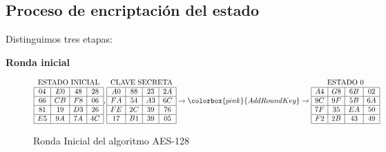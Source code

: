 \subsection{Proceso de encriptación del estado}
Distinguimos tres etapas:
\begin{center}{\bf Ronda inicial}\end{center}
\begin{figure}[!ht]
\begin{figurebox}
\begin{center}
$\begin{array}{|c|c|c|c|}
\multicolumn{4}{c}{\text{ESTADO INICIAL}}\\\hline
04 & E0 & 48 & 28\\\hline
66 & CB & F8 & 06\\\hline
81 & 19 & D3 & 26\\\hline
E5 & 9A & 7A & 4C\\\hline
\end{array},
\begin{array}{|c|c|c|c|}
\multicolumn{4}{c}{\text{CLAVE SECRETA}}\\\hline
A0 & 88 & 23 & 2A\\\hline
FA & 54 & A3 & 6C\\\hline
FE & 2C & 39 & 76\\\hline
17 & B1 & 39 & 05\\\hline
\end{array}\rightarrow
\colorbox{pink}{AddRoundKey}\rightarrow \begin{array}{|c|c|c|c|}
\multicolumn{4}{c}{\text{ESTADO 0}}\\\hline
A4 & G8 & 6B & 02\\\hline
9C & 9F & 5B & 6A\\\hline
7F & 35 & EA & 50\\\hline
F2 & 2B & 43 & 49\\\hline
\end{array}
$
\end{center}\caption{Ronda Inicial del algoritmo AES-128}\label{fig:inputaes1}
\end{figurebox}
\end{figure}


